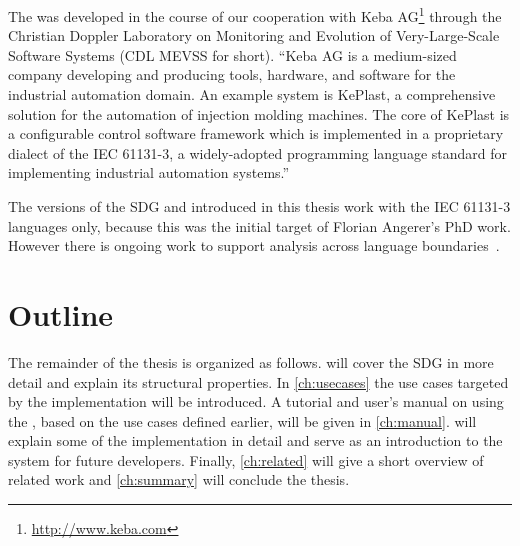 The \SB was developed in the course of our cooperation with Keba AG\footnote{\url{http://www.keba.com}} through the 
Christian Doppler Laboratory on Monitoring and Evolution of Very-Large-Scale Software Systems (CDL MEVSS for short).
\enquote{Keba AG is a medium-sized company developing and producing tools, hardware, and software for the industrial 
automation domain. An example system is KePlast, a comprehensive solution for the automation of injection molding 
machines. The core of KePlast is a configurable control software framework which is implemented in a proprietary 
dialect of the IEC 61131-3, a widely-adopted programming language standard for implementing industrial automation 
systems.}~\cite[sec.~3.1]{DBLP:conf/splc/AngererPLGG14}

The versions of the SDG and \SB introduced in this thesis work with the IEC 61131-3 languages only, because this was 
the initial target of Florian Angerer's PhD work. However there is ongoing work to support analysis across language 
boundaries~\cite{DBLP:conf/kbse/Angerer14}.


\section{Outline}

The remainder of the thesis is organized as follows.
 will cover the SDG in more detail and explain its structural properties.
In \autoref{ch:usecases} the use cases targeted by the \SB implementation will be introduced.
A tutorial and user's manual on using the \SB, based on the use cases defined earlier, will be given in 
\autoref{ch:manual}.
 will explain some of the implementation in detail and serve as an introduction to the system for 
future developers.
Finally, \autoref{ch:related} will give a short overview of related work and \autoref{ch:summary} will conclude the 
thesis.
